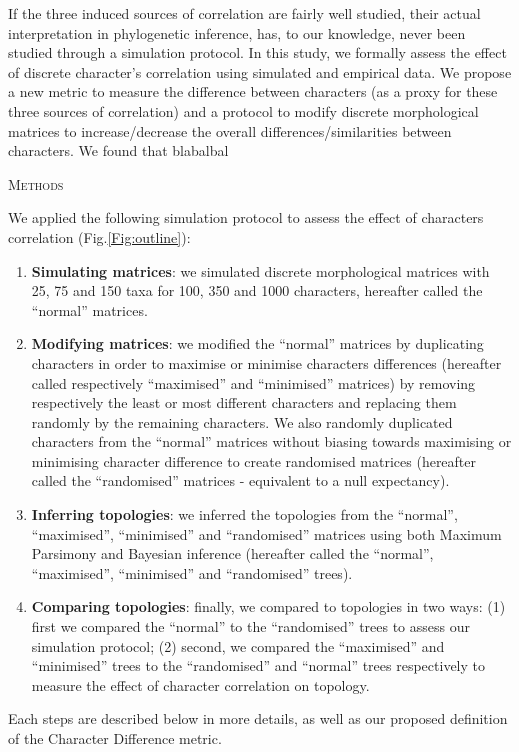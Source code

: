 \documentclass[12pt,letterpaper]{article}
\renewcommand{\section}[1]{%
\bigskip
\begin{center}
\begin{Large}
\normalfont\scshape #1
\medskip
\end{Large}
\end{center}}
\begin{document}
If the three induced sources of correlation are fairly well studied, their actual interpretation in phylogenetic inference, has, to our knowledge, never been studied through a simulation protocol.
In this study, we formally assess the effect of discrete character's correlation using simulated and empirical data.
We propose a new metric to measure the difference between characters (as a proxy for these three sources of correlation) and a protocol to modify discrete morphological matrices to increase/decrease the overall differences/similarities between characters.
We found that blabalbal




\section{Methods}

We applied the following simulation protocol to assess the effect of characters correlation (Fig.\ref{Fig:outline}):
\begin{enumerate}
    \item \textbf{Simulating matrices}: we simulated discrete morphological matrices with 25, 75 and 150 taxa for 100, 350 and 1000 characters, hereafter called the ``normal'' matrices.
    \item \textbf{Modifying matrices}: we modified the ``normal'' matrices by duplicating characters in order to maximise or minimise characters differences (hereafter called respectively ``maximised'' and ``minimised'' matrices) by removing respectively the least or most different characters and replacing them randomly by the remaining characters.
    We also randomly duplicated characters from the ``normal'' matrices without biasing towards maximising or minimising character difference to create randomised matrices (hereafter called the ``randomised'' matrices - equivalent to a null expectancy).
    \item \textbf{Inferring topologies}: we inferred the topologies from the ``normal'', ``maximised'', ``minimised'' and ``randomised'' matrices using both Maximum Parsimony and Bayesian inference (hereafter called the ``normal'', ``maximised'', ``minimised'' and ``randomised'' trees).
    \item \textbf{Comparing topologies}: finally, we compared to topologies in two ways: (1) first we compared the ``normal'' to the ``randomised'' trees to assess our simulation protocol; (2) second, we compared the ``maximised'' and ``minimised'' trees to the ``randomised'' and ``normal'' trees respectively to measure the effect of character correlation on topology.
\end{enumerate}
Each steps are described below in more details, as well as our proposed definition of the Character Difference metric.
\end{document}
